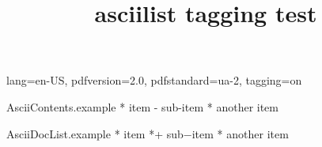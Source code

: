 \DocumentMetadata
  {
    lang=en-US,
    pdfversion=2.0,
    pdfstandard=ua-2,
    tagging=on
  }
\begin{filecontents*}[overwrite]{AsciiContents.example}
 * item
   - sub-item
 * another item
\end{filecontents*}
\begin{filecontents*}[overwrite]{AsciiDocList.example}
* item
*+ sub−item
* another item
\end{filecontents*}

\documentclass{article}
\usepackage{asciilist}

\title{asciilist tagging test}



\begin{enumerate}
\item bla
\item blub
\end{enumerate}



